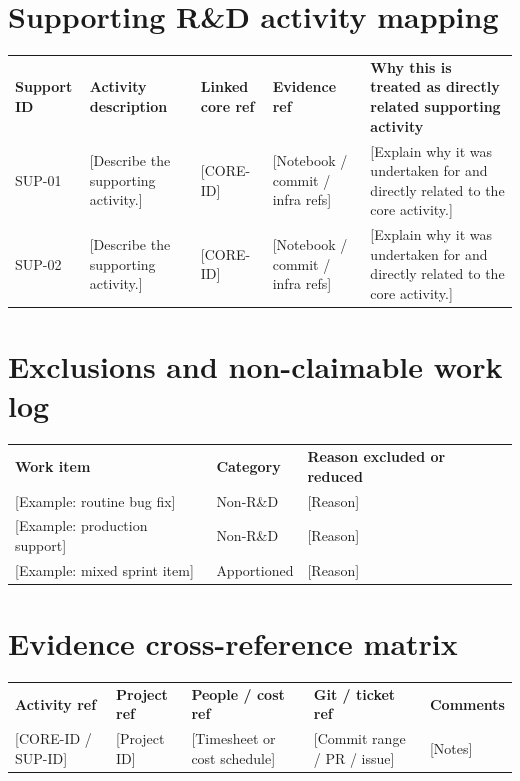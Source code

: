\documentclass[11pt]{article}
\begin{document}
\section{Supporting R\&D activity mapping}
\begin{xltabular}{\textwidth}{L{2.1cm}L{3.7cm}L{2.2cm}L{2.2cm}Y}
\textbf{Support ID} & \textbf{Activity description} & \textbf{Linked core ref} & \textbf{Evidence ref} & \textbf{Why this is treated as directly related supporting activity} \\
SUP-01 & {[Describe the supporting activity.]} & {[CORE-ID]} & {[Notebook / commit / infra refs]} & {[Explain why it was undertaken for and directly related to the core activity.]} \\
SUP-02 & {[Describe the supporting activity.]} & {[CORE-ID]} & {[Notebook / commit / infra refs]} & {[Explain why it was undertaken for and directly related to the core activity.]} \\
\end{xltabular}

\section{Exclusions and non-claimable work log}

\begin{xltabular}{\textwidth}{L{3.6cm}L{2.4cm}Y}
\textbf{Work item} & \textbf{Category} & \textbf{Reason excluded or reduced} \\
{[Example: routine bug fix]} & {Non-R\&D} & {[Reason]} \\
{[Example: production support]} & {Non-R\&D} & {[Reason]} \\
{[Example: mixed sprint item]} & {Apportioned} & {[Reason]} \\
\end{xltabular}

\section{Evidence cross-reference matrix}
\begin{xltabular}{\textwidth}{L{2.0cm}L{2.0cm}L{2.6cm}L{2.4cm}Y}
\textbf{Activity ref} & \textbf{Project ref} & \textbf{People / cost ref} & \textbf{Git / ticket ref} & \textbf{Comments} \\
{[CORE-ID / SUP-ID]} & {[Project ID]} & {[Timesheet or cost schedule]} & {[Commit range / PR / issue]} & {[Notes]} \\
\end{xltabular}
\end{document}
